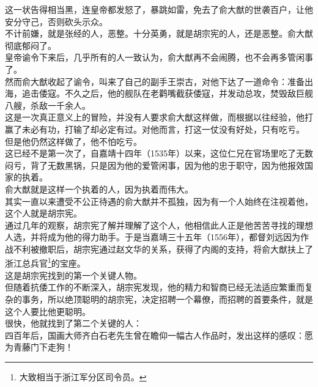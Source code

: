 \begin{multicols}{\theparacolNo}
这一状告得相当黑，连皇帝都发怒了，暴跳如雷，免去了俞大猷的世袭百户，让他安分守己，否则砍头示众。\\

不计前嫌，就是张经的人，恶整。十分英勇，就是胡宗宪的人，还是恶整。俞大猷彻底郁闷了。\\

皇帝谕令下来后，几乎所有的人一致认为，俞大猷再不会闹腾，也不会再多管闲事了。\\

然而俞大猷收起了谕令，叫来了自己的副手王崇古，对他下达了一道命令：准备出海，追击倭寇。不久之后，他的舰队在老鹳嘴截获倭寇，并发动总攻，焚毁敌巨舰八艘，杀敌一千余人。\\

这是一次真正意义上的冒险，并没有人要求俞大猷这样做，而根据以往经验，他打赢了未必有功，打输了却必定有过。对他而言，打这一仗没有好处，只有吃亏。\\

但是他仍然这样做了，他不怕吃亏。\\

这已经不是第一次了，自嘉靖十四年（1535年）以来，这位仁兄在官场里吃了无数闷亏，背了无数黑锅，只是因为他的爱管闲事，因为他的忠于职守，因为他报效国家的执着。\\

俞大猷就是这样一个执着的人，因为执着而伟大。\\

其实一直以来遭受不公正待遇的俞大猷并不孤独，因为有一个人始终在注视着他，这个人就是胡宗宪。\\

通过几年的观察，胡宗宪了解并理解了这个人，他相信此人正是他苦苦寻找的理想人选，并将成为他的得力助手。于是当嘉靖三十五年（1556年），都督刘远因为作战不利被撤职后，胡宗宪通过赵文华的关系，获得了内阁的支持，将俞大猷扶上了浙江总兵官\footnote{大致相当于浙江军分区司令员。}的宝座。\\

这是胡宗宪找到的第一个关键人物。\\

但随着抗倭工作的不断深入，胡宗宪发现，他的精力和智商已经无法适应繁重而复杂的事务，所以绝顶聪明的胡宗宪，决定招聘一个幕僚，而招聘的首要条件，就是这个人要比他更聪明。\\

很快，他就找到了第二个关键的人：\\

四百年后，国画大师齐白石老先生曾在瞻仰一幅古人作品时，发出这样的感叹：愿为青藤门下走狗！\\


\end{multicols}
